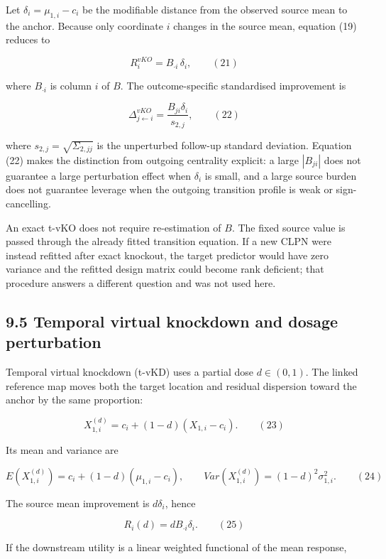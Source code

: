 \documentclass[11pt]{article}
\begin{document}
Let \(\delta_{i} = \mu_{1,i} - c_{i}\) be the modifiable distance from
the observed source mean to the anchor. Because only coordinate \(i\)
changes in the source mean, equation (19) reduces to

\[R_{i}^{vKO} = B_{\cdot i}\,\delta_{i},\quad\quad(21)\]

where \(B_{\cdot i}\) is column \(i\) of \(B\). The outcome-specific
standardised improvement is

\[\Delta_{j \leftarrow i}^{vKO} = \frac{B_{ji}\delta_{i}}{s_{2,j}},\quad\quad(22)\]

where \(s_{2,j} = \sqrt{\Sigma_{2,jj}}\) is the unperturbed follow-up
standard deviation. Equation (22) makes the distinction from outgoing
centrality explicit: a large \(\left| B_{ji} \right|\) does not
guarantee a large perturbation effect when \(\delta_{i}\) is small, and
a large source burden does not guarantee leverage when the outgoing
transition profile is weak or sign-cancelling.

An exact t-vKO does not require re-estimation of \(B\). The fixed source
value is passed through the already fitted transition equation. If a new
CLPN were instead refitted after exact knockout, the target predictor
would have zero variance and the refitted design matrix could become
rank deficient; that procedure answers a different question and was not
used here.

\subsection{9.5 Temporal virtual knockdown and dosage
perturbation}\label{temporal-virtual-knockdown-and-dosage-perturbation}

Temporal virtual knockdown (t-vKD) uses a partial dose \(d \in (0,1)\).
The linked reference map moves both the target location and residual
dispersion toward the anchor by the same proportion:

\[X_{1,i}^{(d)} = c_{i} + (1 - d)\left( X_{1,i} - c_{i} \right).\quad\quad(23)\]

Its mean and variance are

\[E\left( X_{1,i}^{(d)} \right) = c_{i} + (1 - d)\left( \mu_{1,i} - c_{i} \right),\quad\quad Var\left( X_{1,i}^{(d)} \right) = (1 - d)^{2}\sigma_{1,i}^{2}.\quad\quad(24)\]

The source mean improvement is \(d\delta_{i}\), hence

\[R_{i}(d) = dB_{\cdot i}\delta_{i}.\quad\quad(25)\]

If the downstream utility is a linear weighted functional of the mean
response,
\end{document}
